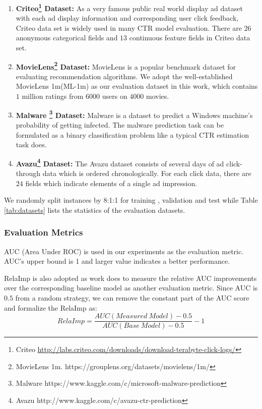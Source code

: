 \documentclass[sigconf]{acmart}
\begin{document}
\begin{enumerate}
  \item \textbf{Criteo\footnote{Criteo \url{http://labs.criteo.com/downloads/download-terabyte-click-logs/}} Dataset:}
  As a very famous public real world display ad dataset with each ad display information and corresponding user click feedback, Criteo data set is widely used in many CTR model evaluation.  There are $26$ anonymous categorical fields and $13$ continuous feature fields in Criteo data set.

  \item \textbf{MovieLens\footnote{MovieLens 1m.   https://grouplens.org/datasets/movielens/1m/} Dataset:}
  MovieLens is a popular benchmark dataset for evaluating recommendation algorithms. We adopt the well-established MovieLens 1m(ML-1m) as our evaluation dataset in this work, which contains $1$ million ratings from $6000$ users on $4000$ movies.

  \item \textbf{Malware \footnote{Malware https://www.kaggle.com/c/microsoft-malware-prediction} Dataset:}
Malware is a dataset to predict a Windows machine's probability of getting infected. The malware prediction task can be formulated as a binary classification problem like a typical CTR estimation task does.


  \item \textbf{Avazu\footnote{Avazu http://www.kaggle.com/c/avazu-ctr-prediction} Dataset:}
    The Avazu dataset consists of several days of ad click-through data which is ordered chronologically. For each click data, there are $24$ fields which indicate elements of a single ad impression.
\end{enumerate}




We randomly split instances by 8:1:1 for training , validation and test while Table \ref{tab:datasets} lists the statistics of the evaluation datasets.







\subsubsection{Evaluation Metrics}


AUC (Area Under ROC) is used in our experiments as the evaluation metric. AUC's upper bound is 1 and larger value indicates a better performance.


RelaImp is also adopted as work \cite{inproceedings} does to measure the relative AUC improvements over the corresponding baseline model as another evaluation metric. Since AUC is $0.5$ from a random strategy, we can remove the constant part of the AUC score and formalize the RelaImp as:
\begin{equation}
  RelaImp = \frac{AUC(Measured\ Model) - 0.5}{AUC(Base\ Model) - 0.5} - 1
\end{equation}
\end{document}
